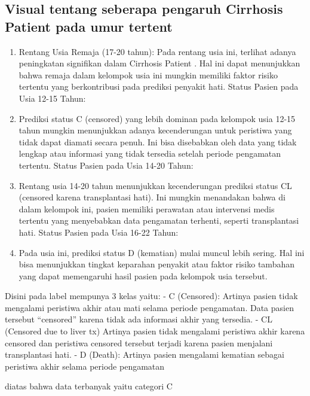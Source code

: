 \documentclass[
  letterpaper,
]{krantz}
\begin{document}
\hypertarget{visual-tentang-seberapa-pengaruh-cirrhosis-patient-pada-umur-tertent-1}{%
\subsection{Visual tentang seberapa pengaruh Cirrhosis Patient pada umur
tertent}\label{visual-tentang-seberapa-pengaruh-cirrhosis-patient-pada-umur-tertent-1}}

\begin{enumerate}
\def\labelenumi{\arabic{enumi}.}
\item
  Rentang Usia Remaja (17-20 tahun): Pada rentang usia ini, terlihat
  adanya peningkatan signifikan dalam Cirrhosis Patient . Hal ini dapat
  menunjukkan bahwa remaja dalam kelompok usia ini mungkin memiliki
  faktor risiko tertentu yang berkontribusi pada prediksi penyakit hati.
  Status Pasien pada Usia 12-15 Tahun:
\item
  Prediksi status C (censored) yang lebih dominan pada kelompok usia
  12-15 tahun mungkin menunjukkan adanya kecenderungan untuk peristiwa
  yang tidak dapat diamati secara penuh. Ini bisa disebabkan oleh data
  yang tidak lengkap atau informasi yang tidak tersedia setelah periode
  pengamatan tertentu. Status Pasien pada Usia 14-20 Tahun:
\item
  Rentang usia 14-20 tahun menunjukkan kecenderungan prediksi status CL
  (censored karena transplantasi hati). Ini mungkin menandakan bahwa di
  dalam kelompok ini, pasien memiliki perawatan atau intervensi medis
  tertentu yang menyebabkan data pengamatan terhenti, seperti
  transplantasi hati. Status Pasien pada Usia 16-22 Tahun:
\item
  Pada usia ini, prediksi status D (kematian) mulai muncul lebih sering.
  Hal ini bisa menunjukkan tingkat keparahan penyakit atau faktor risiko
  tambahan yang dapat memengaruhi hasil pasien pada kelompok usia
  tersebut.
\end{enumerate}

Disini pada label mempunya 3 kelas yaitu: - C (Censored): Artinya pasien
tidak mengalami peristiwa akhir atau mati selama periode pengamatan.
Data pasien tersebut ``censored'' karena tidak ada informasi akhir yang
tersedia. - CL (Censored due to liver tx) Artinya pasien tidak mengalami
peristiwa akhir karena censored dan peristiwa censored tersebut terjadi
karena pasien menjalani transplantasi hati. - D (Death): Artinya pasien
mengalami kematian sebagai peristiwa akhir selama periode pengamatan

diatas bahwa data terbanyak yaitu categori C
\end{document}
